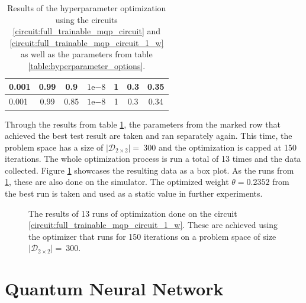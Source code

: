 \begin{table}[]
\begin{tabular}{lcccc|cc|}
\multicolumn{1}{|l|}{0.001}                         & \multicolumn{1}{c|}{0.99}                        & \multicolumn{1}{c|}{0.9}                          & \multicolumn{1}{c|}{$1\mathrm{e}{-8}$}                         & 1       & \multicolumn{1}{c|}{0.3}                          & 0.35    \\ \hline
\multicolumn{1}{|l|}{0.001}                         & \multicolumn{1}{c|}{0.99}                        & \multicolumn{1}{c|}{0.85}                         & \multicolumn{1}{c|}{$1\mathrm{e}{-8}$}                         & 1       & \multicolumn{1}{c|}{0.3}                          & 0.34    \\ \hline
\end{tabular}
    \caption{Results of the hyperparameter optimization using the circuits \ref{circuit:full_trainable_mqp_circuit} and \ref{circuit:full_trainable_mqp_circuit_1_w} as well as the parameters from table \ref{table:hyperparameter_options}.}
    \label{table:hyperparameter_results}
\end{table}

\newpage

Through the results from table \ref{table:hyperparameter_results}, the parameters from the marked row that achieved the best test result are taken and ran separately again. This time, the problem space has a size of $\left|\mathcal{D}_{2\times2}\right| =\ 300$ and the optimization is capped at 150 iterations. The whole optimization process is run a total of 13 times and the data collected. Figure \ref{figure:amsgrad_boxplots} showcases the resulting data as a box plot. As the runs from \ref{table:hyperparameter_results}, these are also done on the simulator. The optimized weight $\theta = 0.2352$ from the best run is taken and used as a static value in further experiments.\par

\begin{figure}[!ht]
    \centering
    \scalebox{0.9}{
        
    }
    \caption{The results of 13 runs of optimization done on the circuit \ref{circuit:full_trainable_mqp_circuit_1_w}. These are achieved using the  optimizer that runs for 150 iterations on a problem space of size $\left|\mathcal{D}_{2\times2}\right| =\ 300$.}
    \label{figure:amsgrad_boxplots}
\end{figure}

\clearpage

\section{Quantum Neural Network}

